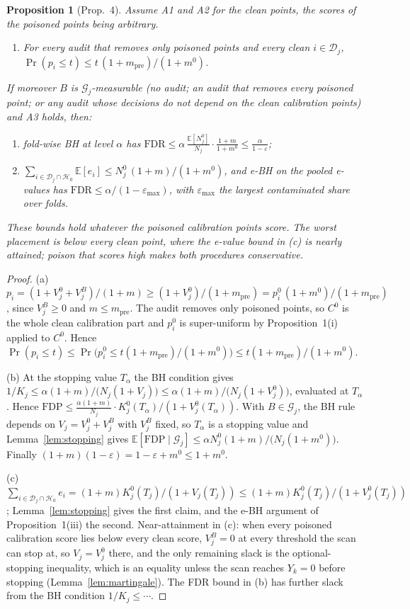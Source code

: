 \documentclass[11pt]{article}
\newtheorem{proposition}{Proposition}
\theoremstyle{definition}
\theoremstyle{remark}
\newcommand{\D}{\mathcal{D}}
\newcommand{\G}{\mathcal{G}}
\newcommand{\Hnull}{\mathcal{H}_0}
\newcommand{\E}{\mathbb{E}}
\newcommand{\1}{\mathbf{1}}
\begin{document}
\begin{proposition}[Prop.~4]\label{prop:contamination}
Assume A1 and A2 for the clean points, the scores of the poisoned points being arbitrary.
\begin{enumerate}[label=(\alph*)]
\item For every audit that removes only poisoned points and every clean $i\in\D_j$,
  $\Pr(p_i\le t)\le t\,(1+m_{\mathrm{pre}})/(1+m^0)$.
\end{enumerate}
If moreover $B$ is $\G_j$-measurable (no audit; an audit that removes every poisoned point; or any
audit whose decisions do not depend on the clean calibration points) and A3 holds, then:
\begin{enumerate}[label=(\alph*),resume]
\item fold-wise BH at level $\alpha$ has
  $\mathrm{FDR}\le\alpha\,\frac{\E[N_j^0]}{N_j}\cdot\frac{1+m}{1+m^0}\le\frac{\alpha}{1-\varepsilon}$;
\item $\sum_{i\in\D_j\cap\Hnull}\E[e_i]\le N_j^0\,(1+m)/(1+m^0)$, and e-BH on the pooled e-values has
  $\mathrm{FDR}\le\alpha/(1-\varepsilon_{\max})$, with $\varepsilon_{\max}$ the largest contaminated
  share over folds.
\end{enumerate}
These bounds hold whatever the poisoned calibration points score. The worst placement is below
every clean point, where the e-value bound in (c) is nearly attained; poison that scores high makes
both procedures conservative.
\end{proposition}

\begin{proof}
(a) $p_i=(1+V^0_j+V^B_j)/(1+m)\ge(1+V^0_j)/(1+m_{\mathrm{pre}})=p^0_i\,(1+m^0)/(1+m_{\mathrm{pre}})$,
since $V^B_j\ge0$ and $m\le m_{\mathrm{pre}}$. The audit removes only poisoned points, so $C^0$ is the
whole clean calibration part and $p^0_i$ is super-uniform by Proposition~1(i) applied to $C^0$.
Hence $\Pr(p_i\le t)\le\Pr\bigl(p^0_i\le t(1+m_{\mathrm{pre}})/(1+m^0)\bigr)\le t(1+m_{\mathrm{pre}})/(1+m^0)$.

(b) At the stopping value $T_\alpha$ the BH condition gives
$1/K_j\le\alpha(1+m)/\bigl(N_j(1+V_j)\bigr)\le\alpha(1+m)/\bigl(N_j(1+V^0_j)\bigr)$, evaluated at
$T_\alpha$. Hence $\mathrm{FDP}\le\frac{\alpha(1+m)}{N_j}\cdot K^0_j(T_\alpha)/(1+V^0_j(T_\alpha))$. With
$B\in\G_j$, the BH rule depends on $V_j=V^0_j+V^B_j$ with $V^B_j$ fixed, so $T_\alpha$ is a stopping
value and Lemma~\ref{lem:stopping} gives
$\E[\mathrm{FDP}\mid\G_j]\le\alpha N_j^0(1+m)/\bigl(N_j(1+m^0)\bigr)$. Finally
$(1+m)(1-\varepsilon)=1-\varepsilon+m^0\le1+m^0$.

(c) $\sum_{i\in\D_j\cap\Hnull}e_i=(1+m)K^0_j(T_j)/(1+V_j(T_j))\le(1+m)K^0_j(T_j)/(1+V^0_j(T_j))$;
Lemma~\ref{lem:stopping} gives the first claim, and the e-BH argument of Proposition~1(iii) the
second. Near-attainment in (c): when every poisoned calibration score lies below every clean
score, $V^B_j=0$ at every threshold the scan can stop at, so $V_j=V^0_j$ there, and the only
remaining slack is the optional-stopping inequality, which is an equality unless the scan reaches
$Y_k=0$ before stopping (Lemma~\ref{lem:martingale}). The FDR bound in (b) has further slack from
the BH condition $1/K_j\le\cdots$.
\end{proof}
\end{document}
